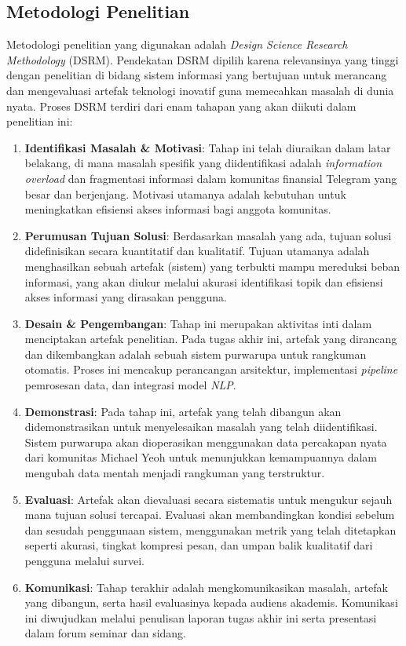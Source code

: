 \subsection{Metodologi Penelitian}
Metodologi penelitian yang digunakan adalah \textit{Design Science Research Methodology} (DSRM). Pendekatan DSRM dipilih karena relevansinya yang tinggi dengan penelitian di bidang sistem informasi yang bertujuan untuk merancang dan mengevaluasi artefak teknologi inovatif guna memecahkan masalah di dunia nyata. Proses DSRM terdiri dari enam tahapan yang akan diikuti dalam penelitian ini:

\begin{enumerate}
\item \textbf{Identifikasi Masalah \& Motivasi}: Tahap ini telah diuraikan dalam latar belakang, di mana masalah spesifik yang diidentifikasi adalah \textit{information overload} dan fragmentasi informasi dalam komunitas finansial Telegram yang besar dan berjenjang. Motivasi utamanya adalah kebutuhan untuk meningkatkan efisiensi akses informasi bagi anggota komunitas.

\item \textbf{Perumusan Tujuan Solusi}: Berdasarkan masalah yang ada, tujuan solusi didefinisikan secara kuantitatif dan kualitatif. Tujuan utamanya adalah menghasilkan sebuah artefak (sistem) yang terbukti mampu mereduksi beban informasi, yang akan diukur melalui akurasi identifikasi topik dan efisiensi akses informasi yang dirasakan pengguna.

\item \textbf{Desain \& Pengembangan}: Tahap ini merupakan aktivitas inti dalam menciptakan artefak penelitian. Pada tugas akhir ini, artefak yang dirancang dan dikembangkan adalah sebuah sistem purwarupa untuk rangkuman otomatis. Proses ini mencakup perancangan arsitektur, implementasi \textit{pipeline} pemrosesan data, dan integrasi model \textit{NLP}.

\item \textbf{Demonstrasi}: Pada tahap ini, artefak yang telah dibangun akan didemonstrasikan untuk menyelesaikan masalah yang telah diidentifikasi. Sistem purwarupa akan dioperasikan menggunakan data percakapan nyata dari komunitas Michael Yeoh untuk menunjukkan kemampuannya dalam mengubah data mentah menjadi rangkuman yang terstruktur.

\item \textbf{Evaluasi}: Artefak akan dievaluasi secara sistematis untuk mengukur sejauh mana tujuan solusi tercapai. Evaluasi akan membandingkan kondisi sebelum dan sesudah penggunaan sistem, menggunakan metrik yang telah ditetapkan seperti akurasi, tingkat kompresi pesan, dan umpan balik kualitatif dari pengguna melalui survei.

\item \textbf{Komunikasi}: Tahap terakhir adalah mengkomunikasikan masalah, artefak yang dibangun, serta hasil evaluasinya kepada audiens akademis. Komunikasi ini diwujudkan melalui penulisan laporan tugas akhir ini serta presentasi dalam forum seminar dan sidang.
\end{enumerate}

